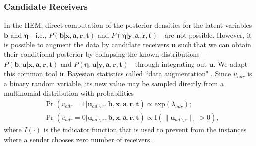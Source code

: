 \documentclass[ba]{imsart}
\numberwithin{equation}{section}
\theoremstyle{plain}
\begin{document}
\subsubsection{Candidate Receivers}
In the HEM, direct computation of the posterior densities for the latent variables $\boldsymbol{b}$ and $\boldsymbol{\eta}$---i.e., $P(\boldsymbol{b}|\boldsymbol{x},\boldsymbol{a}, \boldsymbol{r},\boldsymbol{t})$ and $P(\boldsymbol{\eta}|\boldsymbol{y},\boldsymbol{a}, \boldsymbol{r},\boldsymbol{t})$---are not possible. However, it is possible to augment the data by candidate receivers $\boldsymbol{u}$ such that we can obtain their conditional posterior by collapsing the known distributions---$P(\boldsymbol{b}, \boldsymbol{u}|\boldsymbol{x},\boldsymbol{a}, \boldsymbol{r},\boldsymbol{t})$ and $P(\boldsymbol{\eta}, \boldsymbol{u}| \boldsymbol{y},\boldsymbol{a}, \boldsymbol{r},\boldsymbol{t})$---through integrating out $\boldsymbol{u}$. We adapt this common tool in Bayesian statistics called ``data augmentation" \citep{tanner1987calculation,neal2015exact}. Since $u_{adr}$ is a binary random variable, its new value may be sampled directly from a multinomial distribution with probabilities
\begin{equation}
\begin{aligned}
&\Pr(u_{adr}=1| \boldsymbol{u}_{ad\backslash r}, \boldsymbol{b}, \boldsymbol{x},\boldsymbol{a}, \boldsymbol{r},\boldsymbol{t})
\propto \mbox{exp}(\lambda_{adr});\\
&\Pr(u_{adr}=0| \boldsymbol{u}_{ad\backslash r},\boldsymbol{b}, \boldsymbol{x},\boldsymbol{a}, \boldsymbol{r},\boldsymbol{t})\propto \text{I}(\lVert\boldsymbol{u}_{ad\backslash r}\rVert_1 > 0 ),
\end{aligned}
\label{eqn:latentreceiver}
\end{equation}
where $I(\cdot)$ is the indicator function that is used to prevent from the instances where a sender chooses zero number of receivers. 
\end{document}

